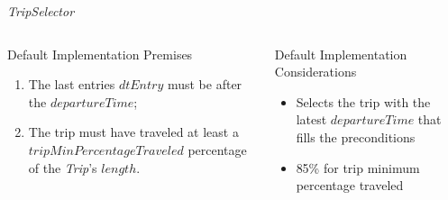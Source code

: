 \documentclass[xcolor=dvipsnames,table]{beamer}
\begin{document}
\begin{frame}{\textit{TripSelector}}
        \begin{columns}
                \begin{block}{Default Implementation Premises}
                        \begin{enumerate}
                                \item The last entries $dtEntry$ must be after the $departureTime$;
                                \item The trip must have traveled at least a $tripMinPercentageTraveled$ percentage of the \textit{Trip}'s $length$.
                        \end{enumerate}
                \end{block}
                \begin{block}{Default Implementation Considerations}
                        \begin{itemize}
                                \item Selects the trip with the latest $departureTime$ that fills the preconditions
                                \item 85\% for trip minimum percentage traveled
                        \end{itemize}
                \end{block}
        \end{columns}
\end{frame}
\end{document}
